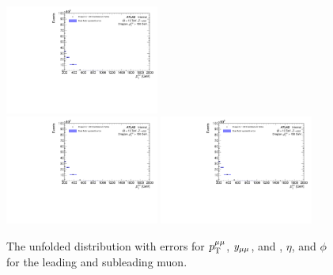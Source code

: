\begin{figure}[h!]
  \includegraphics[page=188,width=0.45\textwidth]{figures/unfoldErrPlots.pdf} \\
  \includegraphics[page=212,width=0.45\textwidth]{figures/unfoldErrPlots.pdf}
  \includegraphics[page=236,width=0.45\textwidth]{figures/unfoldErrPlots.pdf}
  \caption{The unfolded distribution with errors for $p_\mathrm{T}^{\mu\mu}$, $y_{\mu\mu}$, and \pt, $\eta$, and $\phi$ for the leading and subleading muon.}
  \label{fig:unfoldErr1}
\end{figure}

